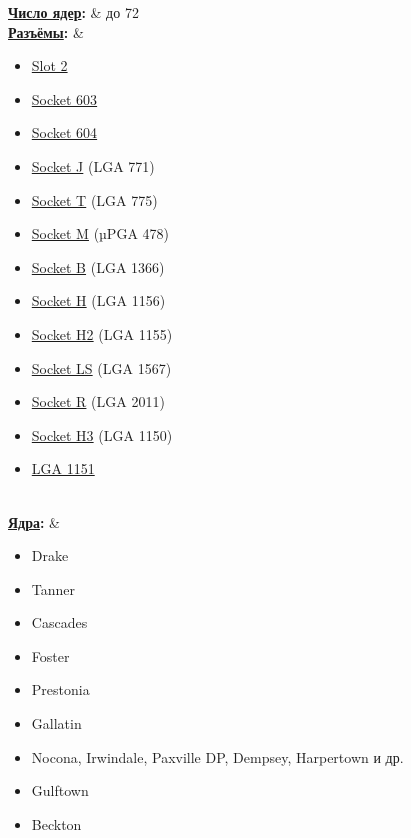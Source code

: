 \documentclass[a4paper,11pt]{article}
\begin{document}
\begin{tabular}
\textbf{\href{https://ru.wikipedia.org/wiki/%D0%9C%D0%BD%D0%BE%D0%B3%D0%BE%D1%8F%D0%B4%D0%B5%D1%80%D0%BD%D1%8B%D0%B9_%D0%BF%D1%80%D0%BE%D1%86%D0%B5%D1%81%D1%81%D0%BE%D1%80}{Число ядер}:} & до 72 \\ 
\textbf{\href{https://ru.wikipedia.org/wiki/%D0%A0%D0%B0%D0%B7%D1%8A%D1%91%D0%BC_%D0%BF%D1%80%D0%BE%D1%86%D0%B5%D1%81%D1%81%D0%BE%D1%80%D0%B0_%D0%BF%D0%B5%D1%80%D1%81%D0%BE%D0%BD%D0%B0%D0%BB%D1%8C%D0%BD%D0%BE%D0%B3%D0%BE_%D0%BA%D0%BE%D0%BC%D0%BF%D1%8C%D1%8E%D1%82%D0%B5%D1%80%D0%B0}{Разъёмы}:} & 
\begin{itemize}
	\item \href{https://ru.wikipedia.org/wiki/Slot_2}{Slot 2}
	\item \href{https://ru.wikipedia.org/wiki/Socket_603}{Socket 603}
	\item \href{https://ru.wikipedia.org/wiki/Socket_604}{Socket 604}
	\item \href{https://ru.wikipedia.org/wiki/Socket_J}{Socket J} (LGA 771)
	\item \href{https://ru.wikipedia.org/wiki/Socket_T}{Socket T} (LGA 775)
	\item \href{https://ru.wikipedia.org/wiki/Socket_M}{Socket M} (µPGA 478)
	\item \href{https://ru.wikipedia.org/wiki/Socket_B}{Socket B} (LGA 1366)
	\item \href{https://ru.wikipedia.org/wiki/Socket_H}{Socket H} (LGA 1156)
	\item \href{https://ru.wikipedia.org/wiki/Socket_H2}{Socket H2} (LGA 1155)
	\item \href{https://ru.wikipedia.org/wiki/Socket_LS}{Socket LS} (LGA 1567)
	\item \href{https://ru.wikipedia.org/wiki/Socket_R}{Socket R} (LGA 2011)
	\item \href{https://ru.wikipedia.org/wiki/Socket_H3}{Socket H3} (LGA 1150)
	\item \href{https://ru.wikipedia.org/wiki/LGA_1151}{LGA 1151}
\end{itemize} \\ 
\textbf{\href{https://ru.wikipedia.org/wiki/%D0%AF%D0%B4%D1%80%D0%BE_%D0%BC%D0%B8%D0%BA%D1%80%D0%BE%D0%BF%D1%80%D0%BE%D1%86%D0%B5%D1%81%D1%81%D0%BE%D1%80%D0%B0}{Ядра}:} & 
\begin{itemize}
	\item Drake
	\item Tanner
	\item Cascades
	\item Foster
	\item Prestonia
	\item Gallatin
	\item Nocona, Irwindale, Paxville DP, Dempsey, Harpertown и др.
	\item Gulftown
	\item Beckton
\end{itemize}
\end{tabular}
\end{document}
